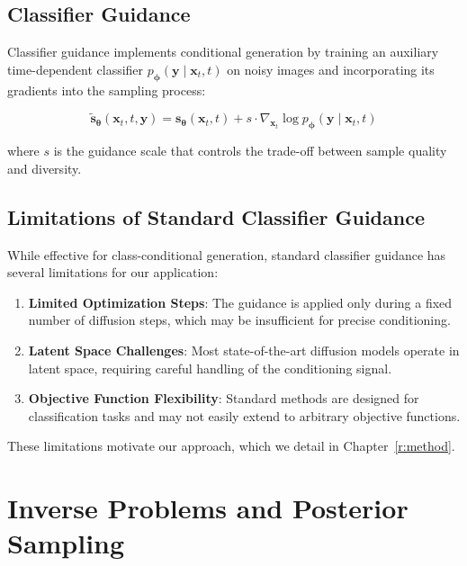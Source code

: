 \documentclass[licencjacka,en]{pracamgr}
\begin{document}
\subsection{Classifier Guidance}

Classifier guidance \cite{dhariwal2021diffusionmodelsbeatgans} implements conditional generation by training an auxiliary time-dependent classifier $p_{\boldsymbol{\phi}}(\mathbf{y} \mid \mathbf{x}_t, t)$ on noisy images and incorporating its gradients into the sampling process:

\begin{equation}
\tilde{\mathbf{s}}_{\boldsymbol{\theta}}(\mathbf{x}_t, t, \mathbf{y}) = \mathbf{s}_{\boldsymbol{\theta}}(\mathbf{x}_t, t) + s \cdot \nabla_{\mathbf{x}_t} \log p_{\boldsymbol{\phi}}(\mathbf{y} \mid \mathbf{x}_t, t)
\label{eq:classifier_guidance}
\end{equation}

where $s$ is the guidance scale that controls the trade-off between sample quality and diversity.

\subsection{Limitations of Standard Classifier Guidance}

While effective for class-conditional generation, standard classifier guidance has several limitations for our application:

\begin{enumerate}
\item \textbf{Limited Optimization Steps}: The guidance is applied only during a fixed number of diffusion steps, which may be insufficient for precise conditioning.

\item \textbf{Latent Space Challenges}: Most state-of-the-art diffusion models operate in latent space, requiring careful handling of the conditioning signal.

\item \textbf{Objective Function Flexibility}: Standard methods are designed for classification tasks and may not easily extend to arbitrary objective functions.
\end{enumerate}

These limitations motivate our approach, which we detail in Chapter~\ref{r:method}.

\section{Inverse Problems and Posterior Sampling}
\end{document}
